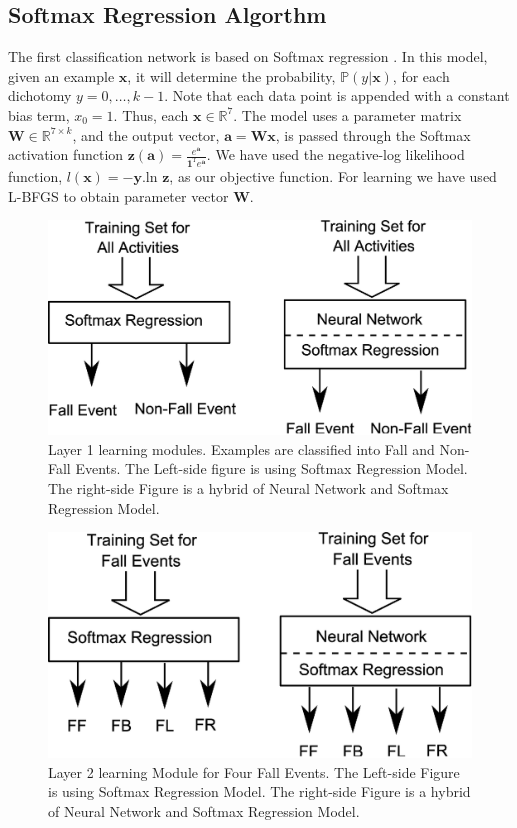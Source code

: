\documentclass{IEEEtran}
\begin{document}
\subsection{Softmax Regression Algorthm}
\label{sec:SoftmaxRegrationAlgorthm}

The first classification network is based on Softmax regression \cite{Bishop06a}. In this 
model, given an 
example $\bm{x}$, it will determine the probability, $\mathbb{P}(y | \bm{x})$, for 
each dichotomy $y=0,\ldots,k-1$. Note that each data point is appended with a constant bias 
term, $x_0 = 1$. Thus,  each $\bm{x} \in \mathbb{R}^7$. The model uses a parameter matrix 
$\bm{W} 
\in \mathbb{R}^{7 \times k}$, and the output vector, $\bm{a} = \bm{Wx}$, is passed 
through 
the 
Softmax 
activation function $\bm{z(a)} = \frac{e^{\bm{a}}}{\bm{1}^\mathtt{T} e^{\bm{a}}}$. We have 
used the negative-log likelihood function, $l(\bm{x}) = -\bm{y}$.ln $\bm{z}$, as our 
objective function. For learning we have used L-BFGS \cite{DBLP:conf/icml/LeNCLPN11} to obtain 
parameter vector $\bm{W}$.  

\begin{figure}[htbp]
	\centering
		\includegraphics[width=0.98\columnwidth]{figures/SoftmaxLayer1.eps}
	\caption{Layer 1 learning modules. Examples are classified into Fall and Non-Fall Events.  The Left-side figure is using Softmax Regression Model. The right-side Figure is a hybrid of Neural Network and Softmax Regression Model.}
	\label{fig:SoftmaxLayer1}
\end{figure}


\begin{figure}[htbp]
	\centering
		\includegraphics[width=0.98\columnwidth]{figures/SoftmaxLayer2Fall.eps}
	\caption{Layer 2 learning Module for Four Fall Events. The Left-side Figure is using Softmax Regression Model. The right-side Figure is a hybrid of Neural Network and Softmax Regression Model. }
	\label{fig:SoftmaxLayer2Fall}
\end{figure}
\end{document}
